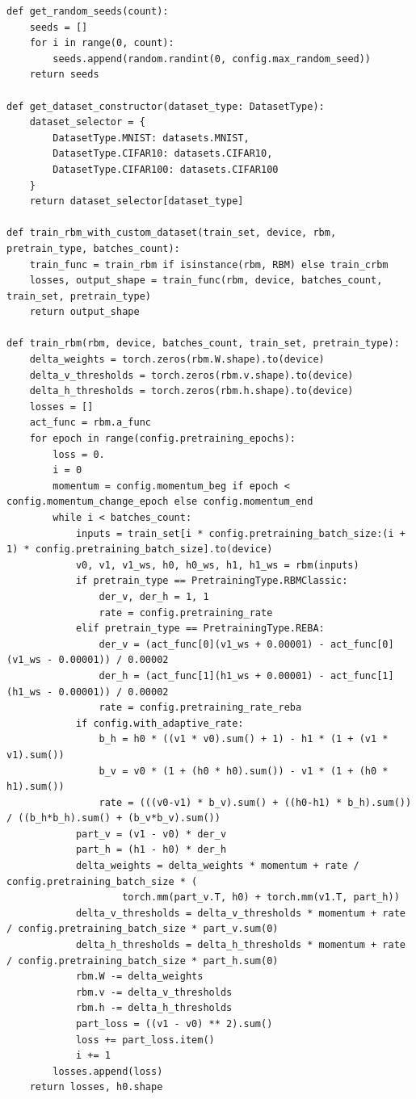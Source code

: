 \begin{lstlisting}[style=PythonStyle]
def get_random_seeds(count):
    seeds = []
    for i in range(0, count):
        seeds.append(random.randint(0, config.max_random_seed))
    return seeds

def get_dataset_constructor(dataset_type: DatasetType):
    dataset_selector = {
        DatasetType.MNIST: datasets.MNIST,
        DatasetType.CIFAR10: datasets.CIFAR10,
        DatasetType.CIFAR100: datasets.CIFAR100
    }
    return dataset_selector[dataset_type]

def train_rbm_with_custom_dataset(train_set, device, rbm, pretrain_type, batches_count):
    train_func = train_rbm if isinstance(rbm, RBM) else train_crbm
    losses, output_shape = train_func(rbm, device, batches_count, train_set, pretrain_type)
    return output_shape

def train_rbm(rbm, device, batches_count, train_set, pretrain_type):
    delta_weights = torch.zeros(rbm.W.shape).to(device)
    delta_v_thresholds = torch.zeros(rbm.v.shape).to(device)
    delta_h_thresholds = torch.zeros(rbm.h.shape).to(device)
    losses = []
    act_func = rbm.a_func
    for epoch in range(config.pretraining_epochs):
        loss = 0.
        i = 0
        momentum = config.momentum_beg if epoch < config.momentum_change_epoch else config.momentum_end
        while i < batches_count:
            inputs = train_set[i * config.pretraining_batch_size:(i + 1) * config.pretraining_batch_size].to(device)
            v0, v1, v1_ws, h0, h0_ws, h1, h1_ws = rbm(inputs)
            if pretrain_type == PretrainingType.RBMClassic:
                der_v, der_h = 1, 1
                rate = config.pretraining_rate
            elif pretrain_type == PretrainingType.REBA:
                der_v = (act_func[0](v1_ws + 0.00001) - act_func[0](v1_ws - 0.00001)) / 0.00002
                der_h = (act_func[1](h1_ws + 0.00001) - act_func[1](h1_ws - 0.00001)) / 0.00002
                rate = config.pretraining_rate_reba
            if config.with_adaptive_rate:
                b_h = h0 * ((v1 * v0).sum() + 1) - h1 * (1 + (v1 * v1).sum())
                b_v = v0 * (1 + (h0 * h0).sum()) - v1 * (1 + (h0 * h1).sum())
                rate = (((v0-v1) * b_v).sum() + ((h0-h1) * b_h).sum()) / ((b_h*b_h).sum() + (b_v*b_v).sum())
            part_v = (v1 - v0) * der_v
            part_h = (h1 - h0) * der_h
            delta_weights = delta_weights * momentum + rate / config.pretraining_batch_size * (
                    torch.mm(part_v.T, h0) + torch.mm(v1.T, part_h))
            delta_v_thresholds = delta_v_thresholds * momentum + rate / config.pretraining_batch_size * part_v.sum(0)
            delta_h_thresholds = delta_h_thresholds * momentum + rate / config.pretraining_batch_size * part_h.sum(0)
            rbm.W -= delta_weights
            rbm.v -= delta_v_thresholds
            rbm.h -= delta_h_thresholds
            part_loss = ((v1 - v0) ** 2).sum()
            loss += part_loss.item()
            i += 1
        losses.append(loss)
    return losses, h0.shape


\end{lstlisting}

